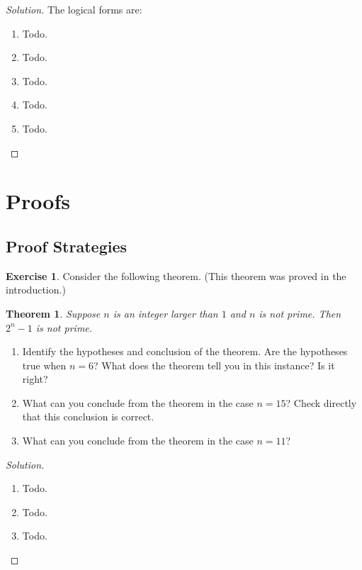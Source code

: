 \documentclass[headings=standardclasses]{scrartcl}
\newtheorem*{theorem}{Theorem}
\theoremstyle{definition}
\newtheorem{exercise}{Exercise}[subsection]
\newenvironment{solution}{\begin{proof}[Solution]}{\end{proof}}
\begin{document}
\begin{solution}
  The logical forms are:
  \begin{enumerate}
    \item Todo.
    \item Todo.
    \item Todo.
    \item Todo.
    \item Todo. \qedhere
  \end{enumerate}
\end{solution}

\section{Proofs}

\subsection{Proof Strategies}

\begin{exercise}
  Consider the following theorem. (This theorem was proved in the
  introduction.)

  \begin{theorem}
    Suppose \(n\) is an integer larger than \(1\) and \(n\) is not prime. Then
    \(2^n - 1\) is not prime.
  \end{theorem}

  \begin{enumerate}
    \item Identify the hypotheses and conclusion of the theorem. Are the
          hypotheses true when \(n = 6\)? What does the theorem tell you in
          this instance? Is it right?
    \item What can you conclude from the theorem in the case \(n = 15\)? Check
          directly that this conclusion is correct.
    \item What can you conclude from the theorem in the case \(n = 11\)?
  \end{enumerate}
\end{exercise}

\begin{solution}~
  \begin{enumerate}
    \item Todo.
    \item Todo.
    \item Todo. \qedhere
  \end{enumerate}
\end{solution}
\end{document}
